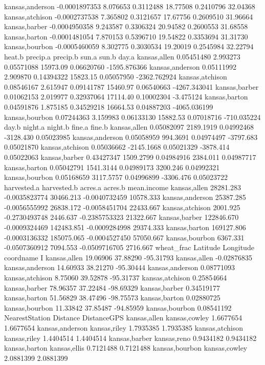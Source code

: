 \documentclass{report}
\begin{document}
\begin{Schunk}
\begin{Soutput}
kansas,anderson   -0.0001897353 8.076653 0.3112488 18.77508 0.2410796 32.04368
kansas,atchison   -0.0002737538 7.365802 0.3121657 17.67756 0.2609510 31.96664
kansas,barber     -0.0004950358 9.243587 0.3306324 20.94582 0.2600553 31.68558
kansas,barton     -0.0001481054 7.870153 0.5396710 19.54822 0.3353694 31.31730
kansas,bourbon    -0.0005460059 8.302775 0.3030534 19.20019 0.2545984 32.22794
                    heat.b precip.a   precip.b    sun.a      sun.b        day.a
kansas,allen    0.05451480 2.993273 0.05571088 15973.09 0.06620760 -1595.876366
kansas,anderson 0.05111992 2.909870 0.14394322 15823.15 0.05057950 -2362.762924
kansas,atchison 0.08546167 2.615947 0.09141787 15460.97 0.06540663 -4267.343041
kansas,barber   0.01062153 2.019977 0.32937064 17114.40 0.10002304    -3.475124
kansas,barton   0.04591876 1.875185 0.34529218 16664.53 0.04887203 -4065.036199
kansas,bourbon  0.07244363 3.159983 0.06133130 15882.53 0.07018716  -710.035224
                     day.b    night.a    night.b    fine.a     fine.b
kansas,allen    0.05082097  2189.1919 0.04992468 -3128.430 0.05023985
kansas,anderson 0.05058959   994.3691 0.04974497 -3797.683 0.05021870
kansas,atchison 0.05036662 -2145.1668 0.05021329 -3878.414 0.05022063
kansas,barber   0.43427347  1509.2799 0.04984916  2384.011 0.04987717
kansas,barton   0.05042791  1541.3144 0.04989173  3200.246 0.04992321
kansas,bourbon  0.05168659  3117.5757 0.04996899 -3306.476 0.05023722
                harvested.a   harvested.b    acres.a       acres.b mean.income
kansas,allen      28281.283 -0.0035823774  30466.213 -0.0040732459   10578.333
kansas,anderson   25387.285 -0.0056555992  26838.172 -0.0058451704   22433.667
kansas,atchison    2001.925 -0.2730493748   2446.637 -0.2385753323   21322.667
kansas,barber    122846.670 -0.0009324469 142483.851 -0.0009284998   29374.333
kansas,barton    169127.806 -0.0003136332 185075.065 -0.0004527450   57050.667
kansas,bourbon     6367.331 -0.0507360912   7094.553 -0.0509716705    2716.667
                wheat_frac Latitude Longitude       coordname           I
kansas,allen      19.06906 37.88290 -95.31793    kansas,allen -0.02876835
kansas,anderson   14.60933 38.21270 -95.30444 kansas,anderson  0.08771093
kansas,atchison    8.75060 39.52878 -95.31737 kansas,atchison  0.25854664
kansas,barber     78.96357 37.22484 -98.69329   kansas,barber  0.34519177
kansas,barton     51.56829 38.47496 -98.75573   kansas,barton  0.02880725
kansas,bourbon    11.33842 37.85487 -94.85959  kansas,bourbon  0.08541192
                NearestStation  Distance DistanceGPS
kansas,allen     kansas,cowley 1.6677654   1.6677654
kansas,anderson   kansas,riley 1.7935385   1.7935385
kansas,atchison   kansas,riley 1.4404514   1.4404514
kansas,barber      kansas,reno 0.9434182   0.9434182
kansas,barton     kansas,ellis 0.7121488   0.7121488
kansas,bourbon   kansas,cowley 2.0881399   2.0881399
\end{Soutput}
\end{Schunk}
\end{document}
